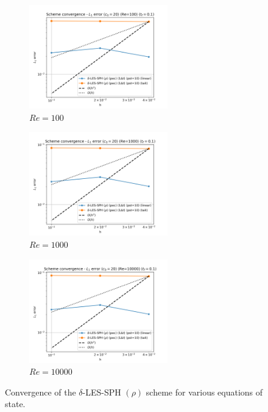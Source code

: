 \begin{figure}[htbp!]
  \begin{subfigure}{7cm}
    \centering\includegraphics[width=6cm]{Code-Figures/deltales_sd/eos/dt_pois_conv_c0_20_re_100.png}
    \caption{$Re = 100$}
  \end{subfigure}
  \begin{subfigure}{7cm}
    \centering\includegraphics[width=6cm]{Code-Figures/deltales_sd/eos/dt_pois_conv_c0_20_re_1000.png}
    \caption{$Re = 1000$}
  \end{subfigure}
  \begin{subfigure}{7cm}
    \centering\includegraphics[width=6cm]{Code-Figures/deltales_sd/eos/dt_pois_conv_c0_20_re_10000.png}
    \caption{$Re = 10000$}
  \end{subfigure}
  \caption{Convergence of the $\delta$-LES-SPH $(\rho)$ scheme for various equations of state.}
  \label{fig:deltales_sd-eos}
\end{figure}

